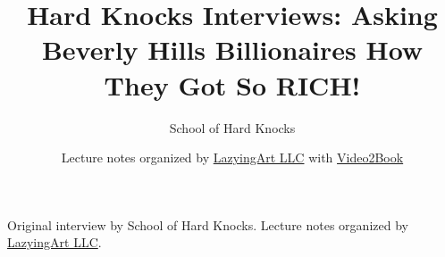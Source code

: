 \documentclass[11pt,oneside]{book}
\begin{document}
\frontmatter
\title{Hard Knocks Interviews: Asking Beverly Hills Billionaires How They Got So RICH!}
\author{School of Hard Knocks}
\date{Lecture notes organized by \href{https://lazying.art}{LazyingArt LLC} with \href{https://github.com/lachlanchen/Video2Book}{Video2Book}}
\maketitle
\begin{center}
\small Original interview by School of Hard Knocks. Lecture notes organized by \href{https://lazying.art}{LazyingArt LLC}.
\end{center}
\clearpage
\mainmatter

\end{document}
